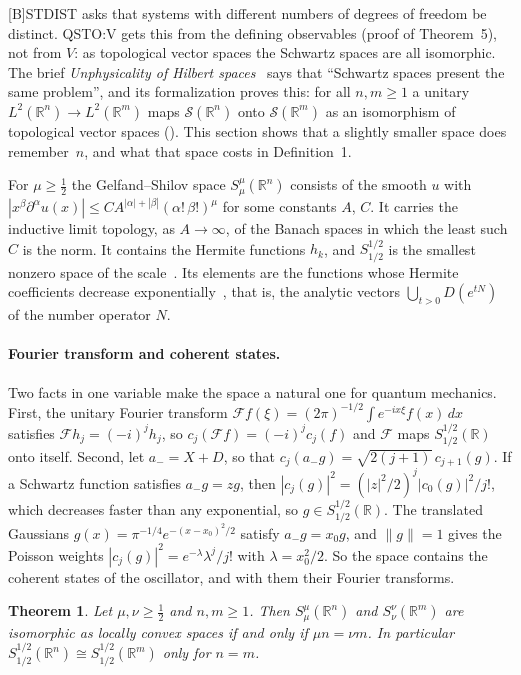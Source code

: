 \documentclass[11pt]{article}
\newtheorem{theorem}{Theorem}[section]
\theoremstyle{definition}
\begin{document}
[B]STDIST asks that systems with different numbers of degrees of freedom be distinct. QSTO:V
gets this from the defining observables (proof of Theorem~5), not from $V$: as topological
vector spaces the Schwartz spaces are all isomorphic. The brief \emph{Unphysicality of Hilbert
spaces}~\cite{hilbert} says that ``Schwartz spaces present the same problem'', and its
formalization proves this: for all $n, m \ge 1$ a unitary $L^2(\mathbb R^n) \to L^2(\mathbb R^m)$
maps $\mathcal S(\mathbb R^n)$ onto $\mathcal S(\mathbb R^m)$ as an isomorphism of topological
vector spaces (). This section shows that a
slightly smaller space does remember~$n$, and what that space costs in Definition~1.

For $\mu \ge \frac12$ the Gelfand--Shilov space $S^\mu_\mu(\mathbb R^n)$ consists of the smooth
$u$ with $|x^\beta\partial^\alpha u(x)| \le C A^{|\alpha| + |\beta|}(\alpha!\,\beta!)^\mu$ for
some constants $A$, $C$. It carries the inductive limit topology, as $A \to \infty$, of the Banach
spaces in which the least such $C$ is the norm. It contains the Hermite functions $h_k$, and
$S^{1/2}_{1/2}$ is the smallest nonzero space of the scale~\cite[Sec.~1]{lcp}. Its elements are
the functions whose Hermite coefficients decrease exponentially~\cite[Remark~1.3]{gpr}, that is,
the analytic vectors $\bigcup_{t > 0} D(e^{tN})$ of the number operator $N$.

\paragraph{Fourier transform and coherent states.} Two facts in one variable make the space a
natural one for quantum mechanics. First, the unitary Fourier transform
$\mathcal F f(\xi) = (2\pi)^{-1/2}\int e^{-ix\xi}f(x)\,dx$ satisfies
$\mathcal F h_j = (-i)^j h_j$, so $c_j(\mathcal F f) = (-i)^j c_j(f)$ and $\mathcal F$ maps
$S^{1/2}_{1/2}(\mathbb R)$ onto itself. Second, let $a_- = X + D$, so that
$c_j(a_- g) = \sqrt{2(j+1)}\,c_{j+1}(g)$. If a Schwartz function satisfies $a_- g = zg$, then
$|c_j(g)|^2 = (|z|^2/2)^j|c_0(g)|^2/j!$, which decreases faster than any exponential, so
$g \in S^{1/2}_{1/2}(\mathbb R)$. The translated Gaussians
$g(x) = \pi^{-1/4}e^{-(x-x_0)^2/2}$ satisfy $a_- g = x_0 g$, and $\|g\| = 1$ gives the
Poisson weights $|c_j(g)|^2 = e^{-\lambda}\lambda^j/j!$ with $\lambda = x_0^2/2$. So the space
contains the coherent states of the oscillator, and with them their Fourier transforms.

\begin{theorem}\label{thm:gs}
  Let $\mu, \nu \ge \frac12$ and $n, m \ge 1$. Then $S^\mu_\mu(\mathbb R^n)$ and
  $S^\nu_\nu(\mathbb R^m)$ are isomorphic as locally convex spaces if and only if
  $\mu n = \nu m$. In particular $S^{1/2}_{1/2}(\mathbb R^n) \cong S^{1/2}_{1/2}(\mathbb R^m)$
  only for $n = m$.
\end{theorem}
\end{document}
